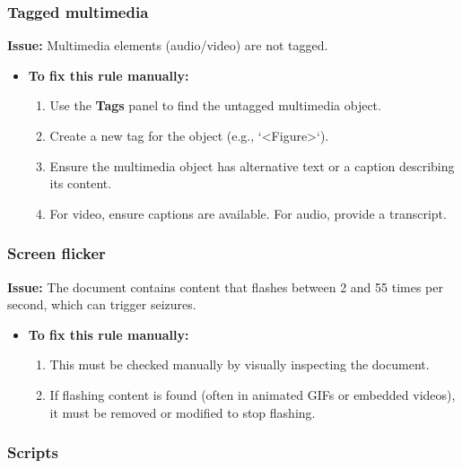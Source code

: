 \subsubsection{Tagged multimedia}
\label{ssubsec:pdf-tagged-multimedia}

\textbf{Issue:} Multimedia elements (audio/video) are not tagged.

\begin{itemize}
	\item \textbf{To fix this rule manually:}
	      \begin{enumerate}
		      \item Use the \textbf{Tags} panel to find the untagged multimedia object.
		      \item Create a new tag for the object (e.g., `<Figure>`).
		      \item Ensure the multimedia object has alternative text or a caption describing its content.
		      \item For video, ensure captions are available. For \gls{audio}, provide a transcript.
	      \end{enumerate}
\end{itemize}

\subsubsection{Screen flicker}
\label{ssubsec:pdf-screen-flicker}

\textbf{Issue:} The document contains content that flashes between 2 and 55 times per second, which can trigger seizures.

\begin{itemize}
	\item \textbf{To fix this rule manually:}
	      \begin{enumerate}
		      \item This must be checked manually by visually inspecting the document.
		      \item If flashing content is found (often in animated GIFs or embedded videos), it must be removed or modified to stop flashing.
	      \end{enumerate}
\end{itemize}

\subsubsection{Scripts}
\label{ssubsec:pdf-scripts}

